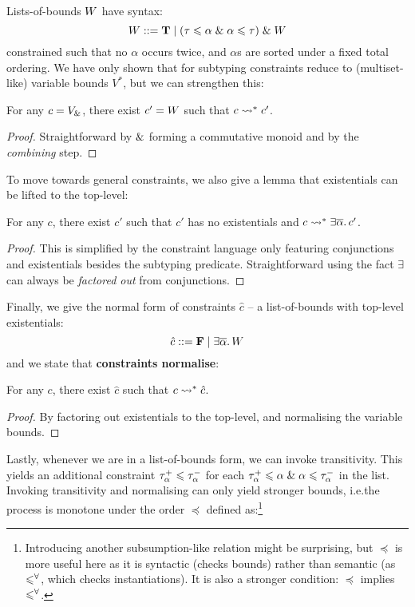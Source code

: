 Lists-of-bounds $W$ have syntax:
$$ W ::= \mathbf T \mid (\tau \leqslant \alpha \;\&\; \alpha \leqslant \tau) \;\&\; W $$
constrained such that no $\alpha$ occurs twice, and $\alpha$s are sorted under a fixed total ordering. We have only shown that for subtyping constraints reduce to (multiset-like) variable bounds $V^*$, but we can strengthen this:
\begin{lemma}
For any $c = V_{\&}$, there exist $c' = W$ such that $c \leadsto^* c'$.
\end{lemma}
\begin{proof}
    Straightforward by $\&$ forming a commutative monoid and by the \emph{combining} step.
\end{proof}
To move towards general constraints, we also give a lemma that existentials can be lifted to the top-level:
\begin{lemma}
    For any $c$, there exist $c'$ such that $c'$ has no existentials and $c \leadsto^* \exists \overline \alpha \ldotp  c'$.
\end{lemma}
\begin{proof}
    This is simplified by the constraint language only featuring conjunctions and existentials besides the subtyping predicate. Straightforward using the fact $\exists$ can always be \emph{factored out} from conjunctions.
\end{proof}
Finally, we give the normal form of constraints $\hat c$ -- a list-of-bounds with top-level existentials:
$$ \hat c ::= \mathbf F \mid \exists \overline{\alpha} \ldotp W $$
and we state that \textbf{constraints normalise}:
\begin{theorem}
For any $c$, there exist $\hat c$ such that $c \leadsto^* \hat c$.
\end{theorem}
\begin{proof}
    By factoring out existentials to the top-level, and normalising the variable bounds.
\end{proof}
Lastly, whenever we are in a list-of-bounds form, we can invoke transitivity. This yields an additional constraint $\tau^+_\alpha \leqslant \tau^-_\alpha$ for each $\tau^+_\alpha \leqslant \alpha \;\&\; \alpha \leqslant \tau^-_\alpha$ in the list. Invoking transitivity and normalising can only yield stronger bounds, i.e.\@ the process is monotone under the order $\preceq$ defined as:\footnote{Introducing another subsumption-like relation might be surprising, but $\preceq$ is more useful here as it is syntactic (checks bounds) rather than semantic (as $\leqslant^\forall$, which checks instantiations). It is also a stronger condition: $\preceq$ implies $\leqslant^\forall$.}
